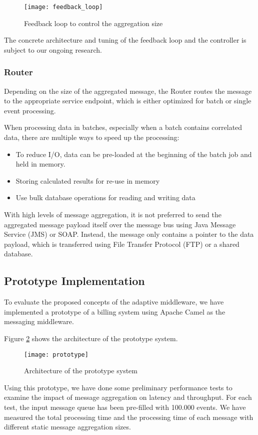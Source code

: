 \begin{figure}[htbp]
	\centering
	\texttt{[image: feedback\_loop]}
	\caption{Feedback loop to control the aggregation size}
	\label{fig:feedback_loop}
\end{figure}
The concrete architecture and tuning of the feedback loop and the controller is subject to our ongoing research.
\subsubsection{Router}
Depending on the size of the aggregated message, the Router routes the message to the appropriate service endpoint, which is either optimized for batch or single event processing.

When processing data in batches, especially when a batch contains correlated data, there are multiple ways to speed up the processing:
\begin{itemize}
	\item To reduce I/O, data can be pre-loaded at the beginning of the batch job and held in memory.
	\item Storing calculated results for re-use in memory
	\item Use bulk database operations for reading and writing data
\end{itemize}

With high levels of message aggregation, it is not preferred to send the aggregated message payload itself over the message bus using Java Message Service (JMS) or SOAP. Instead, the message only contains a pointer to the data payload, which is transferred using File Transfer Protocol (FTP) or a shared database.

\subsection{Prototype Implementation}
To evaluate the proposed concepts of the adaptive middleware, we have implemented a prototype of a billing system using Apache Camel \citep{apachecamel} as the messaging middleware.

Figure \ref{fig:message_prototype} shows the architecture of the prototype system.

\begin{figure}[h!]
	\centering
	\texttt{[image: prototype]}
	\caption{Architecture of the prototype system}
	\label{fig:message_prototype}
\end{figure}

Using this prototype, we have done some preliminary performance tests to examine the impact of message aggregation on latency and throughput. For each test, the input message queue has been pre-filled with 100.000 events. We have measured the total processing time and the processing time of each message with different static message aggregation sizes.

